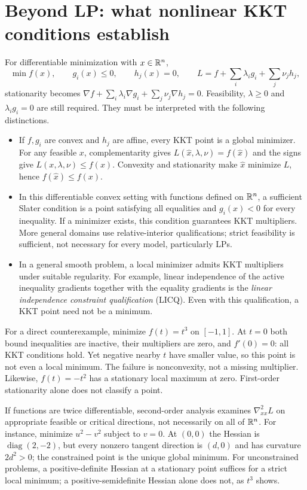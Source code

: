 \documentclass[11pt,a4paper]{article}
\begin{document}
\section{Beyond LP: what nonlinear KKT conditions establish}\label{sec:nonlinear-kkt}
For differentiable minimization with $x\in\mathbb{R}^n$,
\[
  \min f(x),\qquad g_i(x)\leq0,\qquad h_j(x)=0,
  \qquad L=f+\sum_i\lambda_i g_i+\sum_j\nu_jh_j,
\]
stationarity becomes
$\nabla f+\sum_i\lambda_i\nabla g_i+\sum_j\nu_j\nabla h_j=0$.
Feasibility, $\lambda\geq0$ and $\lambda_i g_i=0$ are still required.
They must be interpreted with the following distinctions.
\begin{itemize}[leftmargin=*]
  \item If $f,g_i$ are convex and $h_j$ are affine, every KKT point is a
        global minimizer. For any feasible $x$, complementarity gives
        $L(\hat x,\lambda,\nu)=f(\hat x)$ and the signs give
        $L(x,\lambda,\nu)\leq f(x)$. Convexity and stationarity make
        $\hat x$ minimize $L$, hence $f(\hat x)\leq f(x)$.
  \item In this differentiable convex setting with functions defined on
        $\mathbb{R}^n$, a sufficient Slater condition is a point satisfying all
        equalities and $g_i(x)<0$ for every inequality. If a minimizer exists,
        this condition guarantees KKT multipliers. More general domains use
        relative-interior qualifications; strict feasibility is sufficient,
        not necessary for every model, particularly LPs.
  \item In a general smooth problem, a local minimizer admits KKT multipliers
        under suitable regularity. For example, linear independence of the
        active inequality gradients together with the equality gradients is
        the \emph{linear independence constraint qualification} (LICQ).
        Even with this qualification, a KKT point need not be a minimum.
\end{itemize}

For a direct counterexample, minimize $f(t)=t^3$ on $[-1,1]$.
At $t=0$ both bound inequalities are inactive, their multipliers are zero,
and $f'(0)=0$: all KKT conditions hold. Yet negative nearby $t$ have smaller
value, so this point is not even a local minimum. The failure is nonconvexity,
not a missing multiplier. Likewise, $f(t)=-t^2$ has a stationary local maximum
at zero. First-order stationarity alone does not classify a point.

If functions are twice differentiable, second-order analysis examines
$\nabla^2_{xx}L$ on appropriate feasible or critical directions, not necessarily
on all of $\mathbb{R}^n$. For instance, minimize $u^2-v^2$ subject to $v=0$.
At $(0,0)$ the Hessian is $\operatorname{diag}(2,-2)$, but every nonzero
tangent direction is $(d,0)$ and has curvature $2d^2>0$; the constrained
point is the unique global minimum. For unconstrained problems, a
positive-definite Hessian at a stationary point suffices for a strict local
minimum; a positive-semidefinite Hessian alone does not, as $t^3$ shows.
\end{document}
